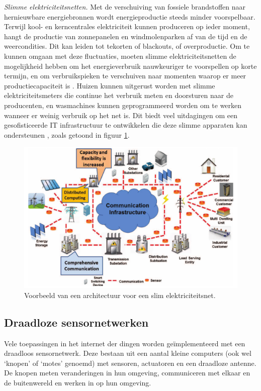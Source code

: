 \documentclass[journal]{IEEEtran}
\begin{document}
\emph{Slimme elektriciteitsnetten.} Met de verschuiving van fossiele brandstoffen naar hernieuwbare energiebronnen wordt energieproductie steeds minder voorspelbaar. Terwijl kool- en kerncentrales elektriciteit kunnen produceren op ieder moment, hangt de productie van zonnepanelen en windmolenparken af van de tijd en de weercondities. Dit kan leiden tot tekorten of blackouts, of overproductie. Om te kunnen omgaan met deze fluctuaties, moeten slimme elektriciteitsnetten de mogelijkheid hebben om het energieverbruik nauwkeuriger te voorspellen op korte termijn, en om verbruikspieken te verschuiven naar momenten waarop er meer productiecapaciteit is \cite{gungor-smart-grid-survey}. Huizen kunnen uitgerust worden met slimme elektriciteitsmeters die continue het verbruik meten en doorsturen naar de producenten, en wasmachines kunnen geprogrammeerd worden om te werken wanneer er weinig verbruik op het net is. Dit biedt veel uitdagingen om een gesofisticeerde IT infrastructuur te ontwikkelen die deze slimme apparaten kan ondersteunen \cite{gungor-smart-grid-technologies}, zoals getoond in figuur \ref{fig:context:smart-grid}.

\begin{figure}
    \centering
    \includegraphics[width=\linewidth]{images/smart-grid-architecture.pdf}
    \caption{Voorbeeld van een architectuur voor een slim elektriciteitsnet. \cite{gungor-smart-grid-technologies}}
    \label{fig:context:smart-grid}
\end{figure}

\subsection{Draadloze sensornetwerken}
Vele toepassingen in het internet der dingen worden ge\"implementeerd met een draadloos sensornetwerk. Deze bestaan uit een aantal kleine computers (ook wel `knopen' of `motes' genoemd) met sensoren, actuatoren en een draadloze antenne. De knopen meten veranderingen in hun omgeving, communiceren met elkaar en de buitenwereld en werken in op hun omgeving.
\end{document}
